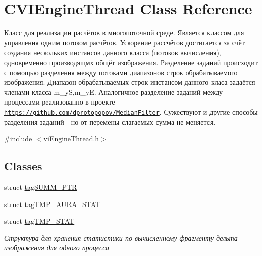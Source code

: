 \hypertarget{class_c_v_i_engine_thread}{\section{C\+V\+I\+Engine\+Thread Class Reference}
\label{class_c_v_i_engine_thread}
}


Класс для реализации расчётов в многопоточной среде. Является классом для управления одним потоком расчётов. Ускорение рассчётов достигается за счёт создания нескольких инстансов данного класса (потоков вычисления), одновременно производящмх общёт изображения. Разделение заданий происходит с помощью разделения между потоками диапазонов строк обрабатываемого изображения. Диапазон обрабатываемых строк инстансом данного класа задаётся членами класса m\+\_\+y\+S,m\+\_\+y\+E. Аналогичное разделение заданий между процессами реализованно в проекте \href{https://github.com/dprotopopov/MedianFilter}{\tt https\+://github.\+com/dprotopopov/\+Median\+Filter}. Сужествуют и другие способы разделения заданий -\/ но от перемены слагаемых сумма не меняется.  




{\ttfamily \#include $<$vi\+Engine\+Thread.\+h$>$}

\subsection*{Classes}
\begin{DoxyCompactItemize}
\item 
struct \hyperlink{struct_c_v_i_engine_thread_1_1tag_s_u_m_m___p_t_r}{tag\+S\+U\+M\+M\+\_\+\+P\+T\+R}
\item 
struct \hyperlink{struct_c_v_i_engine_thread_1_1tag_t_m_p___a_u_r_a___s_t_a_t}{tag\+T\+M\+P\+\_\+\+A\+U\+R\+A\+\_\+\+S\+T\+A\+T}
\item 
struct \hyperlink{struct_c_v_i_engine_thread_1_1tag_t_m_p___s_t_a_t}{tag\+T\+M\+P\+\_\+\+S\+T\+A\+T}
\begin{DoxyCompactList}\small\item\em Структура для хранения статистики по вычисленному фрагменту дельта-\/изображения для одного процесса \end{DoxyCompactList}\end{DoxyCompactItemize}
